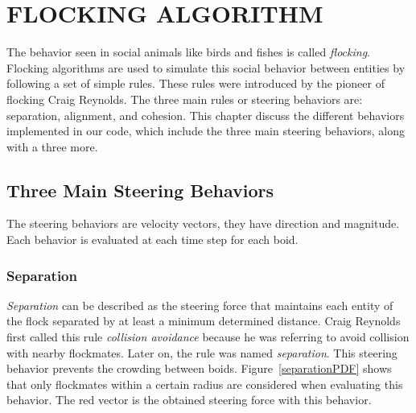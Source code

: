 \chapter{FLOCKING ALGORITHM}\label{chap3}

The behavior seen in social animals like birds and fishes is called \textit{flocking}. Flocking algorithms are used to simulate this social behavior between entities by following a set of simple rules. These rules were introduced by the pioneer of flocking Craig Reynolds\cite{craig1}. The three main rules or steering behaviors are: separation, alignment, and cohesion. This chapter discuss the different behaviors implemented in our code, which include the three main steering behaviors, along with a three more.

\section{Three Main Steering Behaviors}
The steering behaviors are velocity vectors, they have direction and magnitude. Each behavior is evaluated at each time step for each boid.

\subsection{Separation}\label{separationsection}
\textit{Separation} can be described as the steering force that maintains each entity of the flock separated by at least a minimum determined distance. Craig Reynolds first called this rule \textit{collision avoidance} because he was referring to avoid collision with nearby flockmates. Later on, the rule was named \textit{separation}. This steering behavior prevents the crowding between boids. Figure~\ref{separationPDF} shows that only flockmates within a certain radius are considered when evaluating this behavior. The red vector is the obtained steering force with this behavior.

